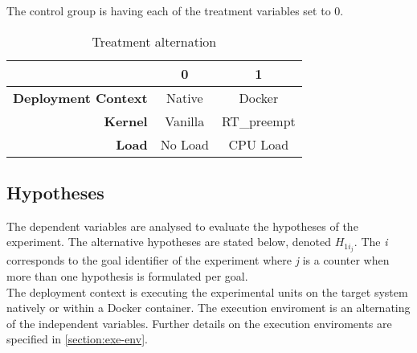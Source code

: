 The control group is having each of the treatment variables set to $0$.

\begin{table}[ht]
\centering
\caption{Treatment alternation}
\label{table:treat-alt}
\renewcommand{\arraystretch}{1.2}
\begin{tabular}{|r|c|c|} \hline
							& \textbf{0}& \textbf{1}	\\ \hline
\textbf{Deployment Context}	& Native 	& Docker 		\\
\textbf{Kernel}				& Vanilla 	& RT\_preempt 	\\
\textbf{Load}				& No Load 	& CPU Load 		\\ \hline

\end{tabular}
\end{table}



\subsection{Hypotheses}
The dependent variables are analysed to evaluate the hypotheses of the experiment. The alternative hypotheses are stated below, denoted $H_{1i_{j}}$. The \textit{i} corresponds to the goal identifier of the experiment where \textit{j} is a counter when more than one hypothesis is formulated per goal.\\

The deployment context is executing the experimental units on the target system natively or within a Docker container. The execution enviroment is an alternating of the independent variables. Further details on the execution enviroments are specified in \ref{section:exe-env}.

